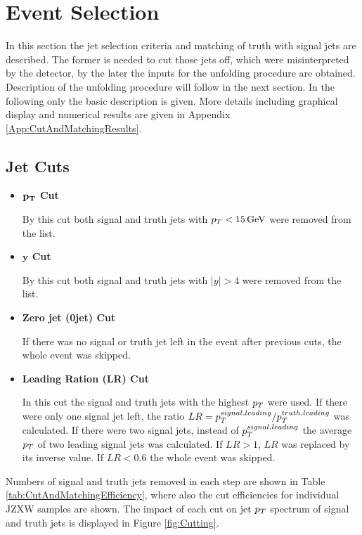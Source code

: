 \section{Event Selection}

In this section the jet selection criteria and matching of truth with signal
jets are described. The former is needed to cut those jets off, which were
misinterpreted by the detector, by the later the inputs for the unfolding
procedure are obtained. Description of the unfolding procedure will follow in
the next section. In the following only the basic description is given. More
details including graphical display and numerical results are given in Appendix
\ref{App:CutAndMatchingResults}.

\subsection{Jet Cuts}

\begin{itemize}
  \item \textbf{$\mathbf{p_{T}}$ Cut}

    By this cut both signal and truth jets with $p_{T} < 15 \,\text{GeV}$ were removed from
    the list.

  \item \textbf{$\mathbf{y}$ Cut}
    
    By this cut both signal and truth jets with $|y| > 4$ were removed from the
    list.

  \item \textbf{Zero jet (0jet) Cut}

    If there was no signal or truth jet left in the event after previous cuts,
    the whole event was skipped.
    
  \item \textbf{Leading Ration (LR) Cut}

    In this cut the signal and truth jets with the highest $p_{T}$ were used. If
    there were only one signal jet left, the ratio $LR = p_{T}^{signal,leading} /
    p_{T}^{truth,leading}$ was calculated. If there were two signal jets, instead
    of $p_{T}^{signal,leading}$ the average $p_{T}$ of two leading signal jets was
    calculated. If $LR > 1$, $LR$ was replaced by its inverse value. If $LR <
    0.6$ the whole event was skipped.

\end{itemize}

Numbers of signal and truth jets removed in each step are shown in Table
\ref{tab:CutAndMatchingEfficiency}, where also the cut efficiencies for individual
JZXW samples are shown. The impact of each cut on jet $p_{T}$ spectrum of signal
and truth jets is displayed in Figure \ref{fig:Cutting}. 


